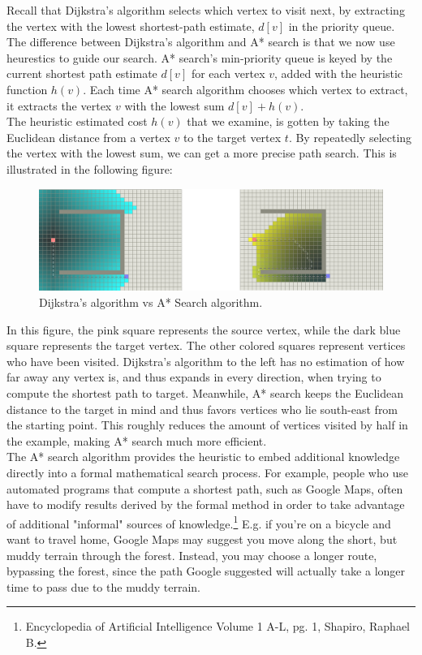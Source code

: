 \documentclass[11pt]{article}
\begin{document}
\noindent Recall that Dijkstra's algorithm selects which vertex to visit next, by extracting the vertex with the lowest shortest-path estimate, $d[v]$ in the priority queue. The difference between Dijkstra's algorithm and A* search is that we now use heurestics to guide our search. A* search's min-priority queue is keyed by the current shortest path estimate $d[v]$ for each vertex $v$, added with the heuristic function $h(v)$. Each time A* search algorithm chooses which vertex to extract, it extracts the vertex $v$ with the lowest sum $d[v]+h(v)$.\\

\noindent  The heuristic estimated cost $h(v)$ that we examine, is gotten by taking the Euclidean distance from a vertex $v$ to the target vertex $t$. By repeatedly selecting the vertex with the lowest sum, we can get a more precise path search. This is illustrated in the following figure:\\

\begin{figure}[H]
\centering
\includegraphics[scale=0.45]{Pictures/Comparison1.png}
\caption[]{Dijkstra's algorithm  vs  A* Search algorithm.\footnotemark}
\end{figure}

\noindent In this figure, the pink square represents the source vertex, while the dark blue square represents the target vertex. The other colored squares represent vertices who have been visited. Dijkstra's algorithm to the left has no estimation of how far away any vertex is, and thus expands in every direction, when trying to compute the shortest path to target. Meanwhile, A* search keeps the Euclidean distance to the target in mind and thus favors vertices who lie south-east from the starting point. This roughly reduces the amount of vertices visited by half in the example, making A* search much more efficient.\\

\noindent The A* search algorithm provides the heuristic to embed additional knowledge directly into a formal mathematical search process. For example, people who use automated programs that compute a shortest path, such as Google Maps, often have to modify results derived by the formal method in order to take advantage of additional "informal" sources of knowledge.\footnote{Encyclopedia of Artificial Intelligence Volume 1 A-L, pg. 1, Shapiro, Raphael B.} E.g. if you're on a bicycle and want to travel home, Google Maps may suggest you move along the short, but muddy terrain through the forest. Instead, you may choose a longer route, bypassing the forest, since the path Google suggested will actually take a longer time to pass due to the muddy terrain. 
\end{document}
